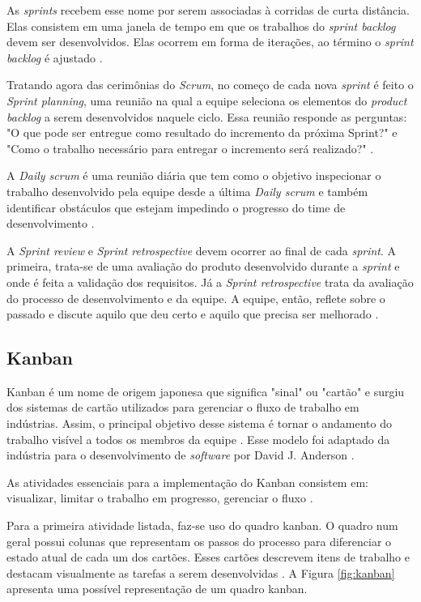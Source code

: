 \documentclass[
    12pt,       %
    openright,      %
    twoside,      %
    a4paper,      %
    english,      %
    french,       %
    spanish,      %
    brazil,       %
    ]{abntex2}
\begin{document}
As \textit{sprints} recebem esse nome por serem associadas à corridas de curta distância. Elas consistem em uma janela de tempo em que os trabalhos do \textit{sprint backlog} devem ser desenvolvidos. Elas ocorrem em forma de iterações, ao término o \textit{sprint backlog} é ajustado \cite{PRESSMAN:2011}.

Tratando agora das cerimônias do \textit{Scrum}, no começo de cada nova \textit{sprint} é feito o \textit{Sprint planning}, uma reunião na qual a equipe seleciona os elementos do \textit{product backlog} a serem desenvolvidos naquele ciclo. Essa reunião responde as perguntas: "O que pode ser entregue como resultado do incremento da próxima Sprint?" e "Como o trabalho necessário para entregar o incremento será realizado?" \cite{Sutherland:2013}.

A \textit{Daily scrum} é uma reunião diária que tem como o objetivo inspecionar o trabalho desenvolvido pela equipe desde a última \textit{Daily scrum} e também identificar obstáculos que estejam impedindo o progresso do time de desenvolvimento \cite{Sutherland:2013}. 

A \textit{Sprint review} e \textit{Sprint retrospective} devem ocorrer ao final de cada \textit{sprint}. A primeira, trata-se de uma avaliação do produto desenvolvido durante a \textit{sprint} e onde é feita a validação dos requisitos. Já a \textit{Sprint retrospective} trata da avaliação do processo de desenvolvimento e da equipe. A equipe, então, reflete sobre o passado e discute aquilo que deu certo e aquilo que precisa ser melhorado \cite{WAZLAWICK:2013}.

\subsection{Kanban}

Kanban é um nome de origem japonesa que significa "sinal" ou "cartão" e surgiu dos sistemas de cartão utilizados para gerenciar o fluxo de trabalho em indústrias. Assim, o principal objetivo desse sistema é tornar o andamento do trabalho visível a todos os membros da equipe \cite{Mariotti:2012}. Esse modelo foi adaptado da indústria para o desenvolvimento de \textit{software} por David J. Anderson \cite{Ghisi:2012}. 

As atividades essenciais para a implementação do Kanban consistem em: visualizar, limitar o trabalho em progresso, gerenciar o fluxo \cite{Mariotti:2012}. 

Para a primeira atividade listada, faz-se uso do quadro kanban. O quadro num geral possui colunas que representam os passos do processo para diferenciar o estado atual de cada um dos cartões. Esses cartões descrevem itens de trabalho e destacam visualmente as tarefas a serem desenvolvidas \cite{ANDERSON:2016}. A Figura \ref{fig:kanban} apresenta uma possível representação de um quadro kanban.
\end{document}
